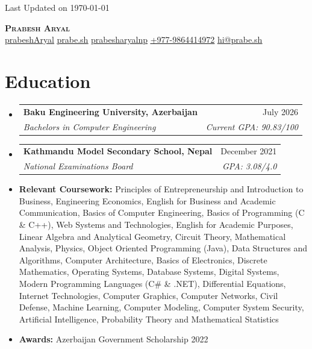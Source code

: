 \documentclass[letterpaper,11pt]{article}
\makeatletter
\newcommand{\resumeEntryHeading}[4]{
  \item %
    \begin{tabular*}{0.97\textwidth}[t]{p{0.7\textwidth}@{\extracolsep{\fill}}r} %
      \textbf{#1} & \small{#3} \\ %
      \textit{\small#2} & \textit{\small #4} \\ %
    \end{tabular*}
}
\newcommand{\resumeSectionListStart}{\begin{itemize}[leftmargin=0.15in, label={}, topsep=0pt, partopsep=0pt, itemsep=7pt]} %
\newcommand{\resumeSectionListEnd}{\end{itemize}}
\newcommand{\ContactEmail}{hi@prabe.sh}
\newcommand{\ContactPhone}{+977-9864414972}
\newcommand{\ContactTelLink}{+9779864414972}
\makeatother
\begin{document}
\begin{flushright}
  \color{gray}\small
  Last Updated on \today
\end{flushright}
\vspace{-10pt} %

\begin{center}
    \textbf{\Huge \scshape Prabesh Aryal} \\ \vspace{8pt}
    \small
     \href{https://github.com/prabeshAryal}{\underline{prabeshAryal}} \quad %
     \href{https://prabe.sh}{\underline{prabe.sh}} \quad
     \href{https://linkedin.com/in/prabesharyalnp}{\underline{prabesharyalnp}} \quad
     \href{tel:\ContactTelLink}{\underline{\ContactPhone}} \quad
     \href{mailto:\ContactEmail}{\underline{\ContactEmail}}
\end{center}

\section{Education}
  \resumeSectionListStart
    \resumeEntryHeading %
      {Baku Engineering University, \footnotesize{Azerbaijan}} %
      {Bachelors in Computer Engineering} %
      {July 2026} %
      {Current GPA: 90.83/100} %

    \resumeEntryHeading
      {Kathmandu Model Secondary School, \footnotesize{Nepal}} %
      {National Examinations Board} %
      {December 2021} %
      {GPA: 3.08/4.0} %

\item \small{
    \textbf{Relevant Coursework:}
    Principles of Entrepreneurship and Introduction to Business,
    Engineering Economics,
    English for Business and Academic Communication,
    Basics of Computer Engineering,
    Basics of Programming (C \& C++),
    Web Systems and Technologies,
    English for Academic Purposes,
    Linear Algebra and Analytical Geometry,
    Circuit Theory,
    Mathematical Analysis,
    Physics,
    Object Oriented Programming (Java),
    Data Structures and Algorithms,
    Computer Architecture,
    Basics of Electronics,
    Discrete Mathematics,
    Operating Systems,
    Database Systems,
    Digital Systems,
    Modern Programming Languages (C\# \& .NET),
    Differential Equations,
    Internet Technologies,
    Computer Graphics,
    Computer Networks,
    Civil Defense,
    Machine Learning,
    Computer Modeling,
    Computer System Security,
    Artificial Intelligence,
    Probability Theory and Mathematical Statistics
}
    \item \small{\textbf{Awards:} Azerbaijan Government Scholarship 2022}
  \resumeSectionListEnd
\end{document}
